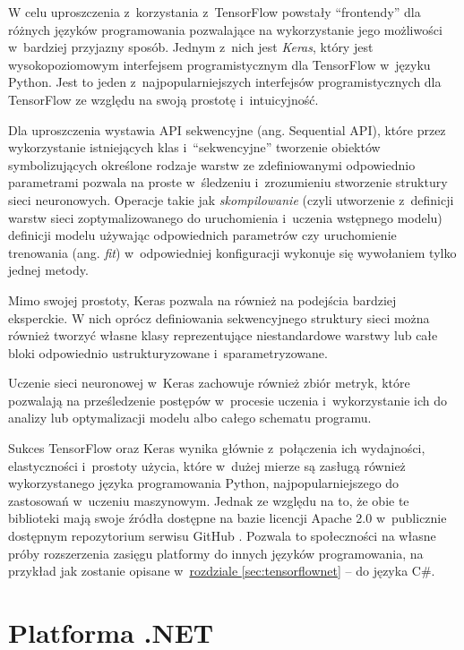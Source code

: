 W celu uproszczenia z~korzystania z~TensorFlow powstały ``frontendy'' dla różnych języków programowania pozwalające na wykorzystanie jego możliwości w~bardziej przyjazny sposób.
Jednym z~nich jest \emph{Keras}, który jest wysokopoziomowym interfejsem programistycznym dla TensorFlow w~języku Python.
Jest to jeden z~najpopularniejszych interfejsów programistycznych dla TensorFlow ze względu na swoją prostotę i~intuicyjność.

Dla uproszczenia wystawia API sekwencyjne (ang. Sequential API), które przez wykorzystanie istniejących klas i~``sekwencyjne'' tworzenie obiektów symbolizujących określone rodzaje warstw ze zdefiniowanymi odpowiednio parametrami pozwala na proste w~śledzeniu i~zrozumieniu stworzenie struktury sieci neuronowych.
Operacje takie jak \emph{skompilowanie} (czyli utworzenie z~definicji warstw sieci zoptymalizowanego do uruchomienia i~uczenia wstępnego modelu) definicji modelu używając odpowiednich parametrów czy uruchomienie trenowania (ang. \emph{fit}) w~odpowiedniej konfiguracji wykonuje się wywołaniem tylko  jednej metody.

Mimo swojej prostoty, Keras pozwala na również na podejścia bardziej eksperckie.
W nich oprócz definiowania sekwencyjnego struktury sieci można również tworzyć własne klasy reprezentujące niestandardowe warstwy lub całe bloki odpowiednio ustrukturyzowane i~sparametryzowane.

Uczenie sieci neuronowej w~Keras zachowuje również zbiór metryk, które pozwalają na prześledzenie postępów w~procesie uczenia i~wykorzystanie ich do analizy lub optymalizacji modelu albo całego schematu programu.

Sukces TensorFlow oraz Keras wynika głównie z~połączenia ich wydajności, elastyczności i~prostoty użycia, które w~dużej mierze są zasługą również wykorzystanego języka programowania Python, najpopularniejszego do zastosowań w~uczeniu maszynowym.
Jednak ze względu na to, że obie te biblioteki mają swoje źródła dostępne na bazie licencji Apache 2.0 w~publicznie dostępnym repozytorium serwisu GitHub \cite{tensorflow}.
Pozwala to społeczności na własne próby rozszerzenia zasięgu platformy do innych języków programowania, na przykład jak zostanie opisane w~\hyperref[sec:tensorflownet]{rozdziale \ref*{sec:tensorflownet}} -- do języka C\#.

\section{Platforma .NET}

